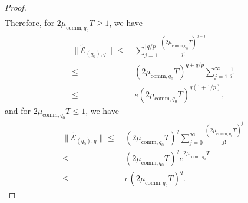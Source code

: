 \documentclass[aps,pra,reprint,groupedaddress,floatfix]{revtex4-2}
\newcommand{\E}{\mathcal{E}}
\begin{document}
\begin{proof}
\begin{align*}
\end{align*}
\newpage
		Therefore, for $2\mu_{\mathrm{comm},q_0}T\ge 1$, we have
    \begin{align*}
	    \big\|\tilde{\E}_{(q_0),q}\big\|\le~& \sum_{j=1}^{\lfloor q/p\rfloor }\frac{(2\mu_{\mathrm{comm},q_0}T)^{q+j}}{j!}\\ 
	    \le ~& (2\mu_{\mathrm{comm},q_0}T)^{q+q/p}\sum_{j=1}^{\infty}\frac{1}{j!} \\
        \le ~& e(2\mu_{\mathrm{comm},q_0}T)^{q(1+1/p)} ,
	\end{align*}
	and for $2\mu_{\mathrm{comm},q_0}T\le 1$, we have
    \begin{align*}
	    \big\|\tilde{\E}_{(q_0),q}\big\| \le~&  (2\mu_{\mathrm{comm},q_0}T)^{q}\sum_{j=0}^{\infty}\frac{ (2\mu_{\mathrm{comm},q_0}T)^{j}}{j!}\\
        \le~&  (2\mu_{\mathrm{comm},q_0}T)^{q} e^{2\mu_{\mathrm{comm},q_0}T}\\
        \le~&  e(2\mu_{\mathrm{comm},q_0}T)^{q}.
	\end{align*}
\end{proof}
\end{document}
